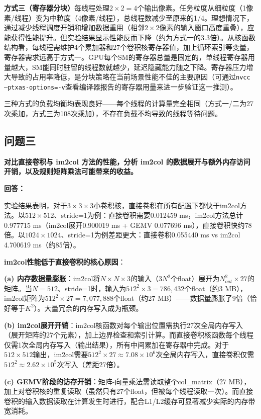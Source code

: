 \documentclass{SYSUReport}
\begin{document}
\textbf{方式三（寄存器分块）}每线程处理$2\times2=4$个输出像素。任务粒度从细粒度（1像素/线程）变为中粒度（4像素/线程），总线程数减少至原来的1/4。理想情况下，通过减少线程调度开销和增加数据重用（相邻$2\times2$像素的输入窗口高度重叠），应能获得性能提升。但实验结果显示性能反而下降（约为方式一的3.3倍）。从核函数结构看，每线程需维护4个累加器和27个卷积核寄存器值，加上循环索引等变量，寄存器需求远高于方式一。GPU每个SM的寄存器总量是固定的，单线程寄存器用量越大，SM能同时驻留的线程数就越少，延迟隐藏能力随之下降。寄存器压力增大导致的占用率降低，是分块策略在当前场景性能不佳的主要原因（可通过\texttt{nvcc --ptxas-options=-v}查看编译器报告的寄存器用量来进一步验证这一推测）。

三种方式的负载均衡均表现良好——每个线程的计算量完全相同（方式一/二为27次乘加，方式三为108次乘加），不存在负载不均导致的线程等待问题。

\subsection{问题三}

\textbf{对比直接卷积与 im2col 方法的性能，分析 im2col 的数据展开与额外内存访问开销，以及规则矩阵乘法可能带来的收益。}

\textbf{回答：}

实验结果表明，对于$3\times3\times3$小卷积核，直接卷积在所有配置下都快于im2col方法。以$512\times512$、stride=1为例：直接卷积需要0.012459 ms，im2col方法总计0.977715 ms（im2col展开0.900019 ms + GEMV 0.077696 ms），直接卷积快约78倍。以$1024\times1024$、stride=1为例差距更大：直接卷积0.055440 ms vs im2col 4.700619 ms（约85倍）。

\textbf{im2col性能低于直接卷积的核心原因}：

\textbf{(a) 内存数据量膨胀}：im2col将$N\times N\times3$的输入（$3N^2$个float）展开为$N_{out}^2\times27$的矩阵。当$N=512$、stride=1时，输入为$512^2\times3=786,432$个float（约3 MB），im2col矩阵为$512^2\times27=7,077,888$个float（约27 MB）——数据量膨胀了9倍（恰好等于$K^2$）。大量冗余的内存写入成为瓶颈。

\textbf{(b) im2col展开开销}：im2col核函数对每个输出位置需执行27次全局内存写入（展开矩阵的27个元素），加上边界检查和索引计算。而直接卷积核函数每个线程仅需1次全局内存写入（输出结果），所有中间累加在寄存器中完成。对于$512\times512$输出，im2col需要$512^2\times27\approx7.08\times10^6$次全局内存写入，直接卷积仅需$512^2\approx2.62\times10^5$次写入（差距27倍）。

\textbf{(c) GEMV阶段的访存开销}：矩阵-向量乘法需读取整个col\_matrix（27 MB），加上对卷积核的重复读取（虽然只有27个float，但被每个线程读取一次）。而直接卷积的输入数据读取在计算发生时进行，配合L1/L2缓存可显著减少实际的内存带宽消耗。
\end{document}
